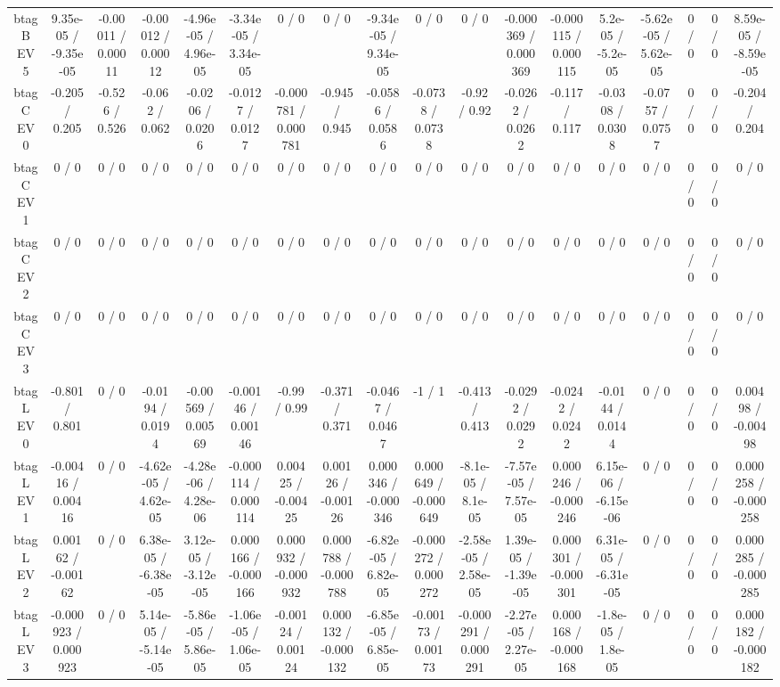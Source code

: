 \documentclass[10pt]{article}
\begin{document}
\begin{table}[htbp]
\begin{center}
\begin{tabular}{|c|c|c|c|c|c|c|c|c|c|c|c|c|c|c|c|c|c|}
  btag B EV 5 & 9.35e-05 / -9.35e-05 & -0.00011 / 0.00011 & -0.00012 / 0.00012 & -4.96e-05 / 4.96e-05 & -3.34e-05 / 3.34e-05 & 0 / 0 & 0 / 0 & -9.34e-05 / 9.34e-05 & 0 / 0 & 0 / 0 & -0.000369 / 0.000369 & -0.000115 / 0.000115 & 5.2e-05 / -5.2e-05 & -5.62e-05 / 5.62e-05 & 0 / 0 & 0 / 0 & 8.59e-05 / -8.59e-05 \\ 
  btag C EV 0 & -0.205 / 0.205 & -0.526 / 0.526 & -0.062 / 0.062 & -0.0206 / 0.0206 & -0.0127 / 0.0127 & -0.000781 / 0.000781 & -0.945 / 0.945 & -0.0586 / 0.0586 & -0.0738 / 0.0738 & -0.92 / 0.92 & -0.0262 / 0.0262 & -0.117 / 0.117 & -0.0308 / 0.0308 & -0.0757 / 0.0757 & 0 / 0 & 0 / 0 & -0.204 / 0.204 \\ 
  btag C EV 1 & 0 / 0 & 0 / 0 & 0 / 0 & 0 / 0 & 0 / 0 & 0 / 0 & 0 / 0 & 0 / 0 & 0 / 0 & 0 / 0 & 0 / 0 & 0 / 0 & 0 / 0 & 0 / 0 & 0 / 0 & 0 / 0 & 0 / 0 \\ 
  btag C EV 2 & 0 / 0 & 0 / 0 & 0 / 0 & 0 / 0 & 0 / 0 & 0 / 0 & 0 / 0 & 0 / 0 & 0 / 0 & 0 / 0 & 0 / 0 & 0 / 0 & 0 / 0 & 0 / 0 & 0 / 0 & 0 / 0 & 0 / 0 \\ 
  btag C EV 3 & 0 / 0 & 0 / 0 & 0 / 0 & 0 / 0 & 0 / 0 & 0 / 0 & 0 / 0 & 0 / 0 & 0 / 0 & 0 / 0 & 0 / 0 & 0 / 0 & 0 / 0 & 0 / 0 & 0 / 0 & 0 / 0 & 0 / 0 \\ 
  btag L EV 0 & -0.801 / 0.801 & 0 / 0 & -0.0194 / 0.0194 & -0.00569 / 0.00569 & -0.00146 / 0.00146 & -0.99 / 0.99 & -0.371 / 0.371 & -0.0467 / 0.0467 & -1 / 1 & -0.413 / 0.413 & -0.0292 / 0.0292 & -0.0242 / 0.0242 & -0.0144 / 0.0144 & 0 / 0 & 0 / 0 & 0 / 0 & 0.00498 / -0.00498 \\ 
  btag L EV 1 & -0.00416 / 0.00416 & 0 / 0 & -4.62e-05 / 4.62e-05 & -4.28e-06 / 4.28e-06 & -0.000114 / 0.000114 & 0.00425 / -0.00425 & 0.00126 / -0.00126 & 0.000346 / -0.000346 & 0.000649 / -0.000649 & -8.1e-05 / 8.1e-05 & -7.57e-05 / 7.57e-05 & 0.000246 / -0.000246 & 6.15e-06 / -6.15e-06 & 0 / 0 & 0 / 0 & 0 / 0 & 0.000258 / -0.000258 \\ 
  btag L EV 2 & 0.00162 / -0.00162 & 0 / 0 & 6.38e-05 / -6.38e-05 & 3.12e-05 / -3.12e-05 & 0.000166 / -0.000166 & 0.000932 / -0.000932 & 0.000788 / -0.000788 & -6.82e-05 / 6.82e-05 & -0.000272 / 0.000272 & -2.58e-05 / 2.58e-05 & 1.39e-05 / -1.39e-05 & 0.000301 / -0.000301 & 6.31e-05 / -6.31e-05 & 0 / 0 & 0 / 0 & 0 / 0 & 0.000285 / -0.000285 \\ 
  btag L EV 3 & -0.000923 / 0.000923 & 0 / 0 & 5.14e-05 / -5.14e-05 & -5.86e-05 / 5.86e-05 & -1.06e-05 / 1.06e-05 & -0.00124 / 0.00124 & 0.000132 / -0.000132 & -6.85e-05 / 6.85e-05 & -0.00173 / 0.00173 & -0.000291 / 0.000291 & -2.27e-05 / 2.27e-05 & 0.000168 / -0.000168 & -1.8e-05 / 1.8e-05 & 0 / 0 & 0 / 0 & 0 / 0 & 0.000182 / -0.000182 \\ 

\end{tabular}
\end{center}
\end{table}
\end{document}
